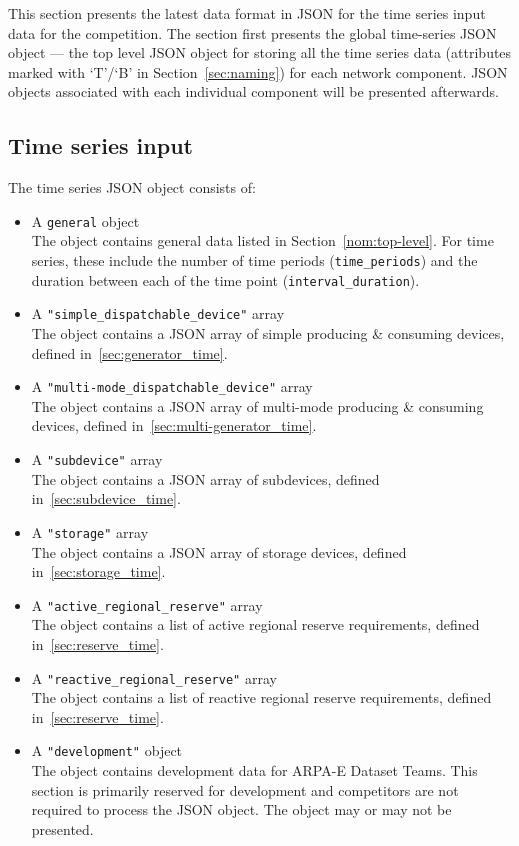 \label{sec:time_series}
This section presents the latest data format in JSON for the 
time series input data for the competition.
The section first presents the global time-series JSON object --- the
top level JSON object for storing all the time series data 
(attributes marked with `T'/`B' in Section~\ref{sec:naming})
for each network component.
JSON objects associated with each individual component will be presented afterwards.


\subsection{Time series input}
\label{sec:input_data}
The time series JSON object consists of:
\begin{itemize}
    \item A \texttt{general} object\\
    The object contains general data listed
    in Section~\ref{nom:top-level}.
    For time series, these include the number of time periods (\texttt{time\_periods}) and the duration
    between each of the time point (\texttt{interval\_duration}).
    \item A \texttt{"simple\_dispatchable\_device"} array\\
    The object contains a JSON array of simple producing \& consuming devices, defined in~\ref{sec:generator_time}.
    \item A \texttt{"multi-mode\_dispatchable\_device"} array \\
    The object contains a JSON array of multi-mode producing \& consuming devices, defined in~\ref{sec:multi-generator_time}.
    \item A \texttt{"subdevice"} array\\
    The object contains a JSON array of subdevices, defined in~\ref{sec:subdevice_time}.
    \item A \texttt{"storage"} array\\
    The object contains a JSON array of storage devices, defined in~\ref{sec:storage_time}.
    \item A \texttt{"active\_regional\_reserve"} array\\
    The object contains a list of active regional reserve requirements, defined in~\ref{sec:reserve_time}.
    \item A \texttt{"reactive\_regional\_reserve"} array\\
    The object contains a list of reactive regional reserve requirements, defined in~\ref{sec:reserve_time}.    
    \item A \texttt{"development"} object\\
    The object contains development data for ARPA-E Dataset Teams. This section is primarily reserved for development and competitors are not required to process the JSON object. The object may or may not be presented. 
\end{itemize}

